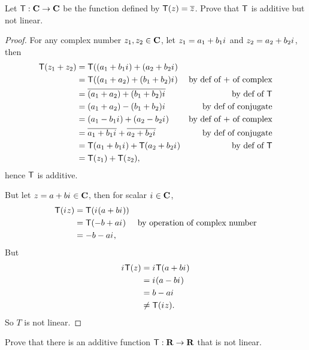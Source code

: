 \begin{exercise} \label{exercise 2.1.39}
Let \(\textsf{T} : \mathbf{C} \to \mathbf{C}\) be the function defined by \(\textsf{T}(z) = \overline{z}\).
Prove that \(\textsf{T}\) is additive but not linear.
\end{exercise}

\begin{proof}
For any complex number \(z_1, z_2 \in \mathbf{C}\), let \(z_1 = a_1 + b_1 {i\mkern1mu}\) and \(z_2 = a_2 + b_2 {i\mkern1mu}\), then
\begin{align*}
    \textsf{T}(z_1 + z_2) & = \textsf{T}((a_1 + b_1 {i\mkern1mu}) + (a_2 + b_2 {i\mkern1mu}) \\
                  & = \textsf{T}((a_1 + a_2) + (b_1 + b_2) {i\mkern1mu}) & \text{by def of \(+\) of complex} \\
                  & = \overline{(a_1 + a_2) + (b_1 + b_2) {i\mkern1mu}} & \text{by def of \(\textsf{T}\)} \\
                  & = (a_1 + a_2) - (b_1 + b_2) {i\mkern1mu} & \text{by def of conjugate} \\
                  & = (a_1 - b_1 {i\mkern1mu}) + (a_2 - b_2 {i\mkern1mu}) & \text{by def of \(+\) of complex} \\
                  & = \overline{a_1 + b_1 {i\mkern1mu}} + \overline{a_2 + b_2 {i\mkern1mu}} & \text{by def of conjugate} \\
                  & = \textsf{T}(a_1 + b_1 {i\mkern1mu}) + \textsf{T}(a_2 + b_2 {i\mkern1mu}) & \text{by def of \(\textsf{T}\)} \\
                  & = \textsf{T}(z_1) + \textsf{T}(z_2),
\end{align*}
hence \(\textsf{T}\) is additive.

But let \(z = a + b {i\mkern1mu} \in \mathbf{C}\), then for scalar \({i\mkern1mu} \in \mathbf{C}\),
\begin{align*}
    \textsf{T}({i\mkern1mu} z) & = \textsf{T}({i\mkern1mu} (a + b {i\mkern1mu})) \\
              & = \textsf{T}(-b + a {i\mkern1mu}) & \text{by operation of complex number} \\
              & = - b - a {i\mkern1mu},
\end{align*}
But
\begin{align*}
    {i\mkern1mu} \textsf{T}(z) & = {i\mkern1mu} \textsf{T}(a + b {i\mkern1mu}) \\
           & = {i\mkern1mu} (a - b {i\mkern1mu}) \\
           & = b - a {i\mkern1mu} \\
           & \ne \textsf{T}({i\mkern1mu} z).
\end{align*}
So \(T\) is not linear.
\end{proof}

\begin{exercise} \label{exercise 2.1.40}
Prove that there is an additive function \(\textsf{T} : \mathbf{R} \to \mathbf{R}\) that is not linear.
\end{exercise}

